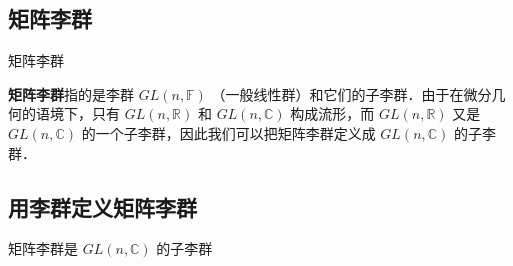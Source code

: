 
\begin{issues}
\issueDraft
\end{issues}


\subsection{矩阵李群}

\begin{definition}{矩阵李群}

\textbf{矩阵李群}指的是李群 $GL(n, \mathbb{F})$ （一般线性群）和它们的子李群．由于在微分几何的语境下，只有 $GL(n, \mathbb{R})$ 和 $GL(n, \mathbb{C})$ 构成流形，而 $GL(n, \mathbb{R})$ 又是 $GL(n, \mathbb{C})$ 的一个子李群，因此我们可以把矩阵李群定义成 $GL(n, \mathbb{C})$ 的子李群．

\end{definition}


\subsection{用李群定义矩阵李群}

\begin{theorem}{}

矩阵李群是 $GL(n, \mathbb{C})$ 的子李群

\end{theorem}